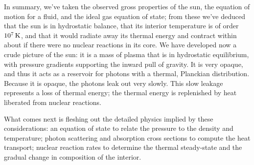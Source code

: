In summary, we've taken the observed gross properties of the sun, the equation of motion for a fluid, and the ideal gas equation of state; from these we've deduced that the sun is in hydrostatic balance, that its interior temperature is of order $10^{7}\,\mathrm{K}$, and that it would radiate away its thermal energy and contract within about  if there were no nuclear reactions in its core.  We have developed now a crude picture of the sun: it is a mass of plasma that is in hydrostatic equilibrium, with pressure gradients supporting the inward pull of gravity.  It is very opaque, and thus it acts as a reservoir for photons with a thermal, Planckian distribution. Because it is opaque, the photons leak out very slowly.  This slow leakage represents a loss of thermal energy; the thermal energy is replenished by heat liberated from nuclear reactions.

What comes next is fleshing out the detailed physics implied by these considerations: an equation of state to relate the pressure to the density and temperature; photon scattering and absorption cross sections to compute the heat transport; nuclear reaction rates to determine the thermal steady-state and the gradual change in composition of the interior.
